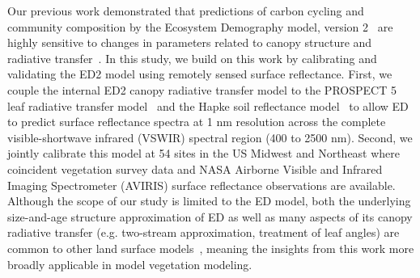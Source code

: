 Our previous work demonstrated that predictions of carbon cycling and community composition by the Ecosystem Demography model, version 2~\citep[ED2;][]{medvigy2009mechanistic} are highly sensitive to changes in parameters related to canopy structure and radiative transfer~\citep{viskari_2019_influence}.
In this study, we build on this work by calibrating and validating the ED2 model using remotely sensed surface reflectance.
First, we couple the internal ED2 canopy radiative transfer model to the PROSPECT 5 leaf radiative transfer model~\citep{feret2008prospect4} and the Hapke soil reflectance model~\citep{verhoef2007coupled} to allow ED to predict surface reflectance spectra at 1 \unit{nm} resolution across the complete visible-shortwave infrared (VSWIR) spectral region (400 to 2500 nm).
Second, we jointly calibrate this model at 54 sites in the US Midwest and Northeast where coincident vegetation survey data and NASA Airborne Visible and Infrared Imaging Spectrometer (AVIRIS) surface reflectance observations are available.
Although the scope of our study is limited to the ED model, both the underlying size-and-age structure approximation of ED as well as many aspects of its canopy radiative transfer (e.g. two-stream approximation, treatment of leaf angles) are common to other land surface models~\citep[e.g., FATES]{koven2020benchmarking}, meaning the insights from this work more broadly applicable in model vegetation modeling.
